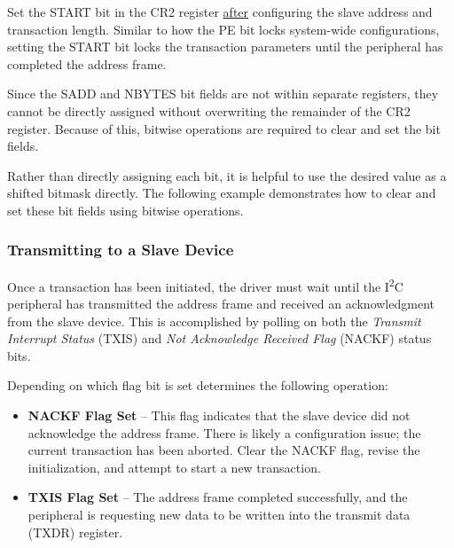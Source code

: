 \documentclass[11pt,fleqn]{book} %
\newcommand{\code}[3]{
    \begin{figure}[]
        \colorbox{gray!20!white}{
            \parbox{\linewidth-2\fboxsep} {
                \centering 
                
            }
        }
        \caption{#2}
        \label{#3}
    \end{figure}
}
\begin{document}
    \begin{warning}
        Set the START bit in the CR2 register \underline{after} configuring the slave address and transaction length. Similar to how the PE bit locks system-wide configurations, setting the START bit locks the transaction parameters until the peripheral has completed the address frame. 
    \end{warning}
    
    \begin{example}
       
        Since the SADD and NBYTES bit fields are not within separate registers, they cannot be directly assigned without overwriting the remainder of the CR2 register. Because of this, bitwise operations are required to clear and set the bit fields. 
        
        Rather than directly assigning each bit, it is helpful to use the desired value as a shifted bitmask directly. The following example demonstrates how to clear and set these bit fields using bitwise operations. 
        
         \smallskip
         \colorbox{gray!20!white}{
             \parbox{\linewidth-2\fboxsep} {
                 \centering 
                 
             }
         }
     
         \smallskip
    \end{example}
    
    \subsubsection{Transmitting to a Slave Device}
        Once a transaction has been initiated, the driver must wait until the I\textsuperscript{2}C peripheral has transmitted the address frame and received an acknowledgment from the slave device. This is accomplished by polling on both the \textit{Transmit Interrupt Status} (TXIS) and \textit{Not Acknowledge Received Flag} (NACKF) status bits. 
        
        Depending on which flag bit is set determines the following operation:
        \begin{itemize}
            \item \textbf{NACKF Flag Set} -- This flag indicates that the slave device did not acknowledge the address frame. There is likely a configuration issue; the current transaction has been aborted. Clear the NACKF flag, revise the initialization, and attempt to start a new transaction. 
            \item \textbf{TXIS Flag Set} -- The address frame completed successfully, and the peripheral is requesting new data to be written into the transmit data (TXDR) register. 
        \end{itemize}
        
\end{document}
